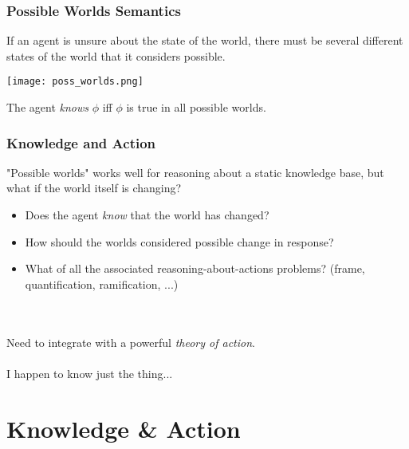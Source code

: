 \documentclass{beamer}
\begin{document}
\begin{frame}
\frametitle{Possible Worlds Semantics}

If an agent is unsure about the state of the world, there must be several
different states of the world that it considers possible.

\begin{center}
  \texttt{[image: poss\_worlds.png]}
\end{center}

The agent \emph{knows} $\phi$ iff $\phi$ is true in all possible worlds.

\end{frame}

\begin{frame}
\frametitle{Knowledge and Action}
"Possible worlds" works well for reasoning about a static knowledge base,
but what if the world itself is changing?
\begin{itemize}
\item  Does the agent \emph{know} that the world has changed?
\item  How should the worlds considered possible change in response?
\item  What of all the associated reasoning-about-actions problems? (frame, quantification, ramification, ...)
\end{itemize}
\ \\
\ \\
Need to integrate with a powerful \emph{theory of action}.
\pause
\ \\
\ \\
I happen to know just the thing...
\end{frame}

\section{Knowledge \& Action}
\end{document}
